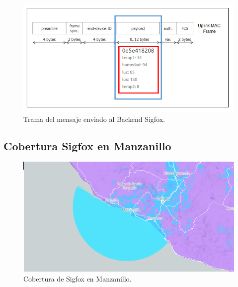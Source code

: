 \documentclass[12pt]{book}
\begin{document}
\begin{figure}[h]
	\centering
	\includegraphics[width=0.7\linewidth]{imagenes/trama}
	\caption[Trama del mensaje enviado al Backend Sigfox. ]{Trama del mensaje enviado al Backend Sigfox. }
	\label{fig:trama}
\end{figure}

\subsection{Cobertura Sigfox en Manzanillo}
\begin{figure}[h]
	\centering
	\includegraphics[width=0.8\linewidth]{imagenes/Cobertura}
	\caption{Cobertura de Sigfox en Manzanillo.}
	\label{fig:Cobertura de Sigfox en Manzanillo}
\end{figure}
\end{document}
